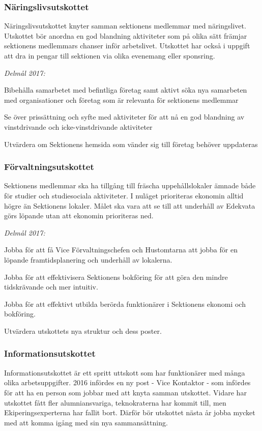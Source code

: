 \documentclass[../_main/handlingar.tex]{subfiles}
\begin{document}
\subsubsection*{Näringslivsutskottet}
Näringslivsutskottet knyter samman sektionens medlemmar med näringslivet. Utskottet bör anordna en god blandning aktiviteter som på olika sätt främjar sektionens medlemmars chanser inför arbetslivet. Utskottet har också i uppgift att dra in pengar till sektionen via olika evenemang eller sponsring.

\emph{Delmål 2017:}
\begin{dashlist}
    \item Bibehålla samarbetet med befintliga företag samt aktivt söka nya samarbeten med organisationer och företag som är relevanta för sektionens medlemmar
    \item Se över prissättning och syfte med aktiviteter för att nå en god blandning av vinstdrivande och icke-vinstdrivande aktiviteter
    \item Utvärdera om Sektionens hemsida som vänder sig till företag behöver uppdateras
\end{dashlist}

\subsubsection*{Förvaltningsutskottet}
Sektionens medlemmar ska ha tillgång till fräscha uppehållslokaler ämnade både för studier och studiesociala aktiviteter. I nuläget prioriteras ekonomin alltid högre än Sektionens lokaler. Målet ska vara att se till att underhåll av Edekvata görs löpande utan att ekonomin prioriteras ned.

\emph{Delmål 2017:}
\begin{dashlist}
    \item Jobba för att få Vice Förvaltningschefen och Hustomtarna att jobba för en löpande framtidsplanering och underhåll av lokalerna.
    \item Jobba för att effektivisera Sektionens bokföring för att göra den mindre tidskrävande och mer intuitiv.
    \item Jobba för att effektivt utbilda berörda funktionärer i Sektionens ekonomi och bokföring.
    \item Utvärdera utskottets nya struktur och dess poster.
\end{dashlist}

\newpage

\subsubsection*{Informationsutskottet}
Informationsutskottet är ett spritt uttskott som har funktionärer med många olika arbetsuppgifter. 2016 infördes en ny post - Vice Kontaktor - som infördes för att ha en person som jobbar med att knyta samman utskottet. Vidare har utskottet fått fler alumniansvariga, teknokraterna har kommit till, men Ekiperingsexperterna har fallit bort. Därför bör utskottet nästa år jobba mycket med att komma igång med sin nya sammansättning.
\end{document}
